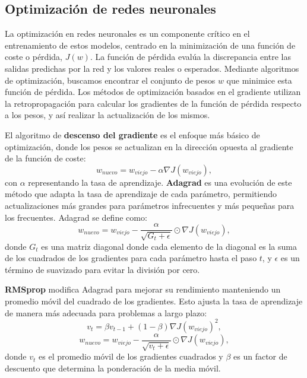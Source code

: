 \subsection{Optimización de redes neuronales}

La optimización en redes neuronales es un componente crítico en el entrenamiento de estos modelos, centrado en la minimización de una función de coste o pérdida, $J(w)$. La función de pérdida evalúa la discrepancia entre las salidas predichas por la red y los valores reales o esperados. Mediante algoritmos de optimización, buscamos encontrar el conjunto de pesos $w$ que minimice esta función de pérdida. Los métodos de optimización basados en el gradiente utilizan la retropropagación para calcular los gradientes de la función de pérdida respecto a los pesos, y así realizar la actualización de los mismos.

El algoritmo de \textbf{descenso del gradiente} es el enfoque más básico de optimización, donde los pesos se actualizan en la dirección opuesta al gradiente de la función de coste:
\begin{equation}
	w_{nuevo} = w_{viejo} - \alpha \nabla J(w_{viejo}),
\end{equation}
con $\alpha$ representando la tasa de aprendizaje. \textbf{Adagrad} es una evolución de este método que adapta la tasa de aprendizaje de cada parámetro, permitiendo actualizaciones más grandes para parámetros infrecuentes y más pequeñas para los frecuentes. Adagrad se define como:
\begin{equation}
	w_{nuevo} = w_{viejo} - \frac{\alpha}{\sqrt{G_{t} + \epsilon}} \odot \nabla J(w_{viejo}),
\end{equation}
donde $G_{t}$ es una matriz diagonal donde cada elemento de la diagonal es la suma de los cuadrados de los gradientes para cada parámetro hasta el paso $t$, y $\epsilon$ es un término de suavizado para evitar la división por cero.

\textbf{RMSprop} modifica Adagrad para mejorar su rendimiento manteniendo un promedio móvil del cuadrado de los gradientes. Esto ajusta la tasa de aprendizaje de manera más adecuada para problemas a largo plazo:
\begin{equation}
	v_{t} = \beta v_{t-1} + (1 - \beta)\nabla J(w_{viejo})^2,
\end{equation}
\begin{equation}
	w_{nuevo} = w_{viejo} - \frac{\alpha}{\sqrt{v_{t} + \epsilon}} \odot \nabla J(w_{viejo}),
\end{equation}
donde $v_{t}$ es el promedio móvil de los gradientes cuadrados y $\beta$ es un factor de descuento que determina la ponderación de la media móvil.

